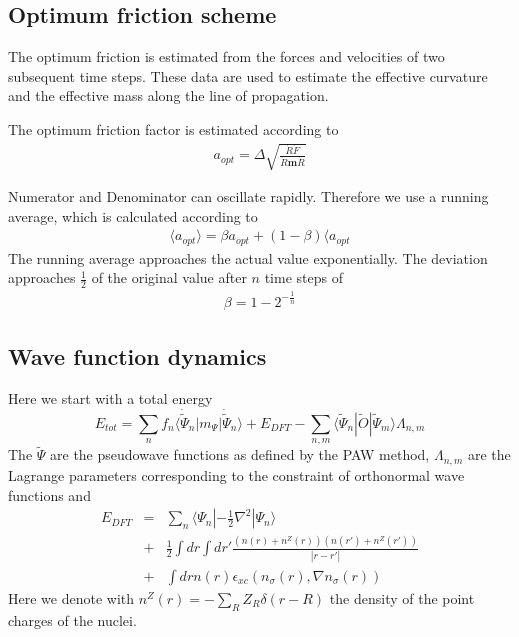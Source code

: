 \documentclass[final,12pt]{article}
\begin{document}
{{{{{{%
\subsection{Optimum friction scheme}
\label{sec:optfric}
The optimum friction is estimated from the forces and velocities of
two subsequent time steps. These data are used to estimate the
effective curvature and the effective mass along the line of
propagation.

The optimum friction factor is estimated according to
\begin{eqnarray*}
a_{opt}=\Delta\sqrt{\frac{\dot{R}\dot{F}}{\dot{R}\mathbf{m}\dot{R}}}
\end{eqnarray*}

Numerator and Denominator can oscillate rapidly. Therefore we use a
running average, which is calculated according to
\begin{eqnarray*}
\langle a_{opt}\rangle=\beta a_{opt}+(1-\beta)\langle a_{opt}
\end{eqnarray*}
The running average approaches the actual value exponentially. The
deviation approaches $\frac{1}{2}$ of the original value after $n$
time steps of
\begin{eqnarray*}
\beta=1-2^{-\frac{1}{n}}
\end{eqnarray*}


\subsection{Wave function dynamics}
Here we start with a total energy
\begin{equation}
E_{tot}=\sum_n f_n\langle\dot{\tilde\Psi}_n|m_\Psi|\dot{\tilde\Psi}_n\rangle+E_{DFT}
-\sum_{n,m} \langle\tilde\Psi_n|\tilde{O}|\tilde\Psi_m\rangle\Lambda_{n,m}
\end{equation}
The $\tilde\Psi$ are the pseudowave functions as defined by the PAW
method, $\Lambda_{n,m}$ are the Lagrange parameters corresponding to
the constraint of orthonormal wave functions and 
\begin{eqnarray*}
E_{DFT}&=&\sum_n\langle\Psi_n|-\frac{1}{2}\nabla^2|\Psi_n\rangle
\\
&+&\frac{1}{2}\int dr \int dr' \frac{(n(r)+n^Z(r))(n(r')+n^Z(r'))}{|r-r'|}
\\
&+&\int dr n(r) \epsilon_{xc}(n_\sigma(r),\nabla n_\sigma(r))
\end{eqnarray*}
Here we denote with $n^Z(r)=-\sum_R Z_R\delta(r-R)$ the density of the
point charges of the nuclei. 

}}}}}}
\end{document}
